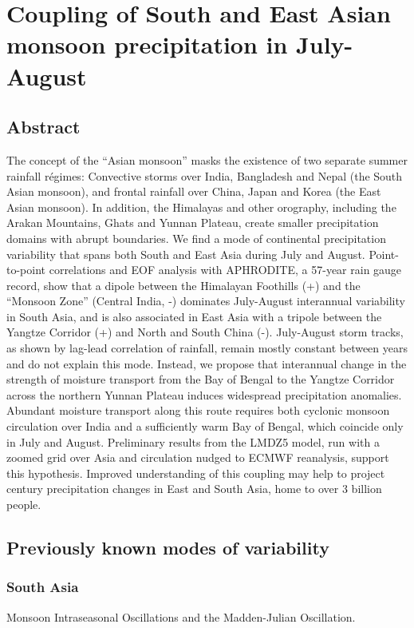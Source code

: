 \chapter{Coupling of South and East Asian monsoon precipitation in July-August}

\section{Abstract}

The concept of the ``Asian monsoon'' masks the existence of two separate summer rainfall r\'egimes: Convective storms over India, Bangladesh and Nepal (the South Asian monsoon), and frontal rainfall over China, Japan and Korea (the East Asian monsoon). In addition, the Himalayas and other orography, including the Arakan Mountains, Ghats and Yunnan Plateau, create smaller precipitation domains with abrupt boundaries. We find a mode of continental precipitation variability that spans both South and East Asia during July and August. Point-to-point correlations and EOF analysis with APHRODITE, a 57-year rain gauge record, show that a dipole between the Himalayan Foothills (+) and the ``Monsoon Zone'' (Central India, -) dominates July-August interannual variability in South Asia, and is also associated in East Asia with a tripole between the Yangtze Corridor (+) and North and South China (-). July-August storm tracks, as shown by lag-lead correlation of rainfall, remain mostly constant between years and do not explain this mode. Instead, we propose that interannual change in the strength of moisture transport from the Bay of Bengal to the Yangtze Corridor across the northern Yunnan Plateau induces widespread precipitation anomalies. Abundant moisture transport along this route requires both cyclonic monsoon circulation over India and a sufficiently warm Bay of Bengal, which coincide only in July and August. Preliminary results from the LMDZ5 model, run with a zoomed grid over Asia and circulation nudged to ECMWF reanalysis, support this hypothesis. Improved understanding of this coupling may help to project  century precipitation changes in East and South Asia, home to over 3 billion people.

\section{Previously known modes of variability}

\subsection{South Asia}
Monsoon Intraseasonal Oscillations and the Madden-Julian Oscillation.

